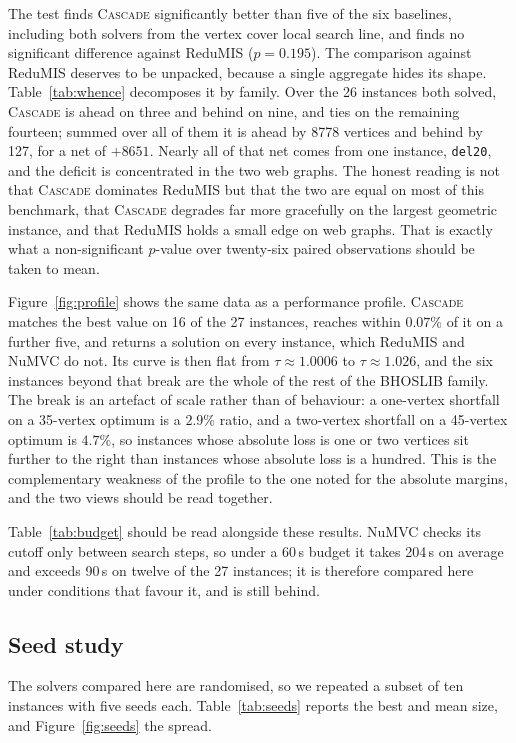 \documentclass[preprint,12pt]{elsarticle}
\theoremstyle{definition}
\begin{document}
The test finds \textsc{Cascade} significantly better than five of the six
baselines, including both solvers from the vertex cover local search line, and
finds no significant difference against ReduMIS ($p = 0.195$). The comparison
against ReduMIS deserves to be unpacked, because a single aggregate hides its
shape. Table~\ref{tab:whence} decomposes it by family. Over the 26 instances
both solved, \textsc{Cascade} is ahead on three and behind on nine, and ties on
the remaining fourteen; summed over all of them it is ahead by 8778 vertices and
behind by 127, for a net of $+8651$. Nearly all of that net comes from one
instance, \texttt{del20}, and the deficit is concentrated in the two web graphs.
The honest reading is not that \textsc{Cascade} dominates ReduMIS but that the
two are equal on most of this benchmark, that \textsc{Cascade} degrades far more
gracefully on the largest geometric instance, and that ReduMIS holds a small
edge on web graphs. That is exactly what a non-significant $p$-value over
twenty-six paired observations should be taken to mean.

Figure~\ref{fig:profile} shows the same data as a performance profile.
\textsc{Cascade} matches the best value on 16 of the 27 instances, reaches
within $0.07\%$ of it on a further five, and returns a solution on every
instance, which ReduMIS and NuMVC do not. Its curve is then flat from
$\tau \approx 1.0006$ to $\tau \approx 1.026$, and the six instances beyond that
break are the whole of the rest of the BHOSLIB family. The break is an artefact
of scale rather than of behaviour: a one-vertex shortfall on a 35-vertex optimum
is a $2.9\%$ ratio, and a two-vertex shortfall on a 45-vertex optimum is
$4.7\%$, so instances whose absolute loss is one or two vertices sit further to
the right than instances whose absolute loss is a hundred. This is the
complementary weakness of the profile to the one noted for the absolute margins,
and the two views should be read together.

Table~\ref{tab:budget} should be read alongside these results. NuMVC checks its
cutoff only between search steps, so under a 60\,s budget it takes 204\,s on
average and exceeds 90\,s on twelve of the 27 instances; it is therefore
compared here under conditions that favour it, and is still behind.

\subsection{Seed study}

The solvers compared here are randomised, so we repeated a subset of ten
instances with five seeds each. Table~\ref{tab:seeds} reports the best and mean
size, and Figure~\ref{fig:seeds} the spread.
\end{document}
